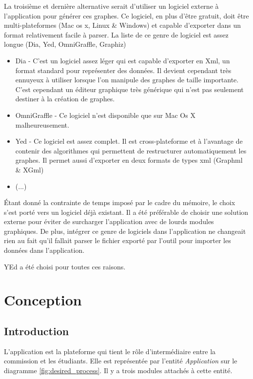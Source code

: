La troisième et dernière alternative serait d'utiliser un logiciel externe à l'application pour générer ces graphes. Ce logiciel, en plus d'être gratuit, doit être multi-plateformes (Mac os x, Linux \& Windows) et capable d'exporter dans un format relativement facile à parser. La liste de ce genre de logiciel est assez longue (Dia, Yed, OmniGraffle, Graphiz)
\begin{itemize}
  \item Dia - C'est un logiciel assez léger qui est capable d'exporter en Xml, un format standard pour représenter des données. Il devient cependant très ennuyeux à utiliser lorsque l'on manipule des graphes de taille importante. C'est cependant un éditeur graphique très générique qui n'est pas seulement destiner à la création de graphes. 
  \item OmniGraffle - Ce logiciel n'est disponible que sur Mac Os X malheureusement.
  \item Yed - Ce logiciel est assez complet. Il est cross-plateforme et à l'avantage de contenir des algorithmes qui permettent de restructurer automatiquement les graphes. Il permet aussi d'exporter en deux formats de types xml (Graphml \& XGml)
  \item (...)
\end{itemize}

Étant donné la contrainte de temps imposé par le cadre du mémoire, le choix s'est porté vers un logiciel déjà existant. Il a été préférable de choisir une solution externe pour éviter de surcharger l'application avec de lourds modules graphiques. De plus, intégrer ce genre de logiciels dans l'application ne changeait rien au fait qu'il fallait parser le fichier exporté par l'outil pour importer les données dans l'application.

YEd a été choisi pour toutes ces raisons. 
\clearpage
\section{Conception}
\subsection{Introduction}
 
L'application est la  plateforme qui tient le rôle d'intermédiaire entre la commission et les étudiants. Elle est représentée par l'entité \textit{Application} sur le diagramme \ref{fig:desired_process}. Il y a trois modules attachés à cette entité.

